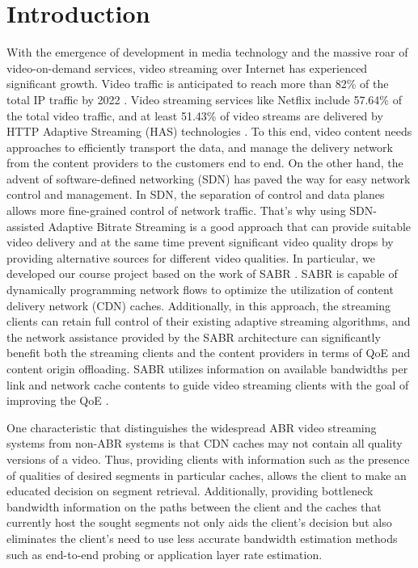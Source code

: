 \documentclass[12pt]{article}
\begin{document}
\onehalfspacing
\newpage
\tableofcontents


\doublespacing
\newpage
{}
\section{Introduction}
With the emergence of development in media technology and the massive roar of video-on-demand services, video streaming over Internet has experienced significant growth. Video traffic is anticipated to reach more than 82\% of the total IP traffic by 2022 \cite{cisco_2018}. Video streaming services like Netflix include 57.64\% of the total video traffic, and at least 51.43\% of video streams are delivered by HTTP Adaptive Streaming (HAS) technologies \cite{survey}. To this end, video content needs approaches to efficiently transport the data, and manage the delivery network from the content providers to the customers end to end. On the other hand, the advent of software-defined networking (SDN) has paved the way for easy network control and management. In SDN, the separation of control and data planes allows more fine-grained control of network traffic. That's why using SDN-assisted Adaptive Bitrate Streaming is a good approach that can provide suitable video delivery and at the same time prevent significant video quality drops by providing alternative sources for different video qualities. In particular, we developed our course project based on the work of SABR \cite{bhat_network_2017}. SABR is capable of dynamically programming network flows to optimize the utilization of content delivery network (CDN) caches. Additionally, in this approach, the streaming clients can retain full control of their existing adaptive streaming algorithms, and the network assistance provided by the SABR architecture can significantly benefit both the streaming clients and the content providers in terms of QoE and content origin offloading. SABR utilizes information on available bandwidths per link and network cache contents to guide video streaming clients with the goal of improving the QoE \cite{bhat_network_2017}.

One characteristic that distinguishes the widespread ABR video streaming systems from non-ABR systems is that CDN caches may not contain all quality versions of a video. Thus, providing clients with information such as the presence of qualities of desired segments in particular caches, allows the client to make an educated decision on segment retrieval. Additionally, providing bottleneck bandwidth information on the paths between the client and the caches that currently host the sought segments not only aids the client's decision but also eliminates the client's need to use less accurate bandwidth estimation methods such as end-to-end probing or application layer rate estimation.
\end{document}

